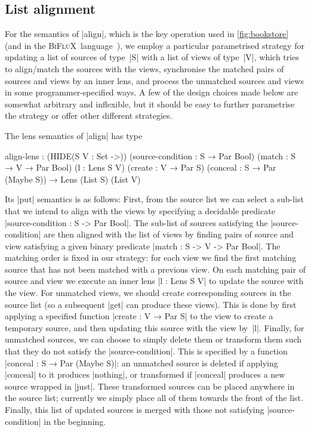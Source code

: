 \documentclass[fleqn]{llncs}
\newcommand{\BiFluX}{\textsc{BiFluX}}
\begin{document}
\subsection{List alignment}
\label{sec:list-alignment}

For the semantics of |align|, which is the key operation used in \autoref{fig:bookstore} (and in the \BiFluX\ language~\cite{Pacheco-BiFluX}), we employ a particular parametrised strategy for updating a list of sources of type~|S| with a list of views of type~|V|, which tries to align/match the sources with the views, synchronise the matched pairs of sources and views by an inner lens, and process the unmatched sources and views in some programmer-specified ways.
A few of the design choices made below are somewhat arbitrary and inflexible, but it should be easy to further parametrise the strategy or offer other different strategies.

The lens semantics of |align| has type
\begin{code}
align-lens : (HIDE({S V : Set} ->))
  (source-condition : S → Par Bool) (match : S → V → Par Bool)
  (l : Lens S V) (create : V → Par S) (conceal : S → Par (Maybe S)) →
  Lens (List S) (List V)
\end{code}
Its |put| semantics is as follows:
First, from the source list we can select a sub-list that we intend to align with the views by specifying a decidable predicate 
|source-condition : S -> Par Bool|.
The sub-list of sources satisfying the |source-condition| are then aligned with the list of views by finding pairs of source and view satisfying a given binary predicate |match : S -> V -> Par Bool|.
The matching order is fixed in our strategy: for each view we find the first matching source that has not been matched with a previous view.
On each matching pair of source and view we execute an inner lens |l : Lens S V| to update the source with the view.
For unmatched views, we should create corresponding sources in the source list (so a subsequent |get| can produce these views).
This is done by first applying a specified function |create : V → Par S| to the view to create a temporary source, and then updating this source with the view by~|l|.
Finally, for unmatched sources, we can choose to simply delete them or transform them such that they do not satisfy the |source-condition|.
This is specified by a function |conceal : S → Par (Maybe S)|: an unmatched source is deleted if applying |conceal| to it produces |nothing|, or transformed if |conceal| produces a new source wrapped in |just|.
These transformed sources can be placed anywhere in the source list; currently we simply place all of them towards the front of the list.
Finally, this list of updated sources is merged with those not satisfying |source-condition| in the beginning.
\end{document}
